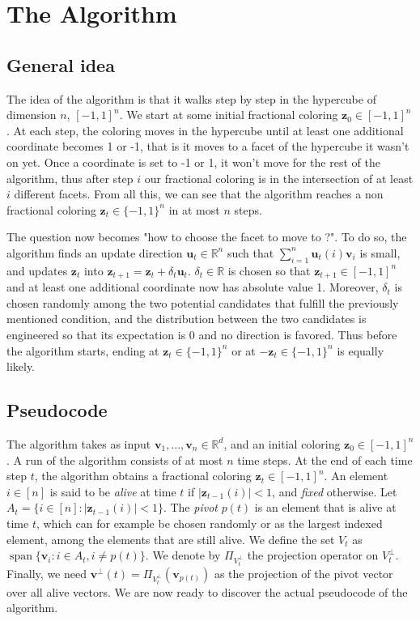 \documentclass[12pt]{article}
\DeclareMathOperator{\Span}{span}
\begin{document}
\section{The Algorithm}
\subsection{General idea}
The idea of the algorithm is that it walks step by step in the hypercube of dimension $n$, $[-1,1]^n$. We start at some initial fractional coloring $\textbf{z}_0\in[-1,1]^n$. At each step, the coloring moves in the hypercube until at least one additional coordinate becomes 1 or -1, that is it moves to a facet of the hypercube it wasn't on yet. Once a coordinate is set to -1 or 1, it won't move for the rest of the algorithm, thus after step $i$ our fractional coloring is in the intersection of at least $i$ different facets. From all this, we can see that the algorithm reaches a non fractional coloring $\textbf{z}_t\in\{-1,1\}^n$ in at most $n$ steps.

The question now becomes "how to choose the facet to move to ?". To do so, the algorithm finds an update direction $\textbf{u}_t\in\mathbb{R}^n$ such that $\sum_{i=1}^n\textbf{u}_t(i)\textbf{v}_i$ is small, and updates $\textbf{z}_t$ into $\textbf{z}_{t+1}=\textbf{z}_t+\delta_t\textbf{u}_t$. $\delta_t\in\mathbb{R}$ is chosen so that $\textbf{z}_{t+1}\in[-1,1]^n$ and at least one additional coordinate now has absolute value 1. Moreover, $\delta_t$ is chosen randomly among the two potential candidates that fulfill the previously mentioned condition, and the distribution between the two candidates is engineered so that its expectation is 0 and no direction is favored. Thus before the algorithm starts, ending at $\textbf{z}_t\in\{-1,1\}^n$ or at $-\textbf{z}_t\in\{-1,1\}^n$ is equally likely.

\subsection{Pseudocode}
The algorithm takes as input $\textbf{v}_1,\ldots,\textbf{v}_n\in\mathbb{R}^d$, and an initial coloring $\textbf{z}_0\in[-1,1]^n$. A run of the algorithm consists of at most $n$ time steps. At the end of each time step $t$, the algorithm obtains a fractional coloring $\textbf{z}_t\in[-1,1]^n$. An element $i \in [n]$ is said to be \textit{alive} at time $t$ if $|\textbf{z}_{t-1}(i)|<1$, and \textit{fixed} otherwise. Let $A_t=\{i\in[n]:|\textbf{z}_{t-1}(i)|<1\}$. The \textit{pivot} $p(t)$ is an element that is alive at time $t$, which can for example be chosen randomly or as the largest indexed element, among the elements that are still alive. We define the set $V_t$ as $\Span\{\textbf{v}_i:i\in A_t,i\not=p(t)\}$. We denote by $\Pi_{V_t^\perp}$ the projection operator on $V_t^\perp$. Finally, we need $\textbf{v}^{\perp}(t)=\Pi_{V_t^\perp}(\textbf{v}_{p(t)})$ as the projection of the pivot vector over all alive vectors. We are now ready to discover the actual pseudocode of the algorithm.
\end{document}
